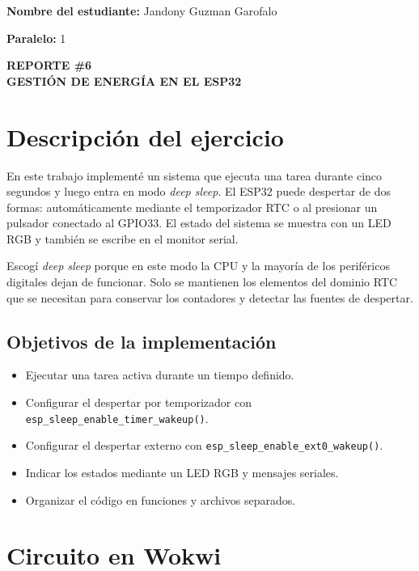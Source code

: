 \documentclass{article}
\begin{document}
\noindent\textbf{Nombre del estudiante:} Jandony Guzman Garofalo

\vspace{0.5em}
\noindent\textbf{Paralelo:} 1

\vspace{1em}
\begin{center}
  \textbf{REPORTE \#6}\\[0.5em]
  \textbf{GESTIÓN DE ENERGÍA EN EL ESP32}
\end{center}

\vspace{1em}

\section{Descripción del ejercicio}

En este trabajo implementé un sistema que ejecuta una tarea durante cinco segundos y luego entra en modo \textit{deep sleep}. El ESP32 puede despertar de dos formas: automáticamente mediante el temporizador RTC o al presionar un pulsador conectado al GPIO33. El estado del sistema se muestra con un LED RGB y también se escribe en el monitor serial.

Escogí \textit{deep sleep} porque en este modo la CPU y la mayoría de los periféricos digitales dejan de funcionar. Solo se mantienen los elementos del dominio RTC que se necesitan para conservar los contadores y detectar las fuentes de despertar.

\subsection{Objetivos de la implementación}

\begin{itemize}
  \item Ejecutar una tarea activa durante un tiempo definido.
  \item Configurar el despertar por temporizador con \texttt{esp\_sleep\_enable\_timer\_wakeup()}.
  \item Configurar el despertar externo con \texttt{esp\_sleep\_enable\_ext0\_wakeup()}.
  \item Indicar los estados mediante un LED RGB y mensajes seriales.
  \item Organizar el código en funciones y archivos separados.
\end{itemize}

\section{Circuito en Wokwi}
\end{document}
